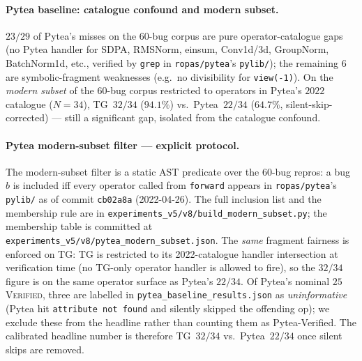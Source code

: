\paragraph{Pytea baseline: catalogue confound and modern subset.}
$23/29$ of Pytea's misses on the $60$-bug corpus are pure
operator-catalogue gaps (no Pytea handler for SDPA, RMSNorm,
einsum, Conv1d/3d, GroupNorm, BatchNorm1d, etc., verified by
\texttt{grep} in \texttt{ropas/pytea}'s \texttt{pylib/}); the
remaining $6$ are symbolic-fragment weaknesses (e.g.\ no
divisibility for \texttt{view(-1)}). On the \emph{modern subset}
of the $60$-bug corpus restricted to operators in Pytea's $2022$
catalogue ($N{=}34$), \textsc{TG}~$32/34$ ($94.1\%$) vs.\
Pytea~$22/34$ ($64.7\%$, silent-skip-corrected) --- still
a significant gap, isolated from the catalogue confound.

\paragraph{Pytea modern-subset filter --- explicit protocol.}
The modern-subset filter is a static AST predicate over the
$60$-bug repros: a bug $b$ is included iff every operator
called from \texttt{forward} appears in
\texttt{ropas/pytea}'s \texttt{pylib/} as of commit
\texttt{cb02a8a} (2022-04-26).  The full inclusion list and the
membership rule are in
\texttt{experiments\_v5/v8/build\_modern\_subset.py}; the
membership table is committed at
\texttt{experiments\_v5/v8/pytea\_modern\_subset.json}.  The
\emph{same} fragment fairness is enforced on \textsc{TG}: TG is
restricted to its 2022-catalogue handler intersection at
verification time (no TG-only operator handler is allowed to
fire), so the $32/34$ figure is on the same operator surface as
Pytea's $22/34$.  Of Pytea's nominal $25$ \textsc{Verified},
three are
labelled in \texttt{pytea\_baseline\_results.json} as
\emph{uninformative} (Pytea hit \texttt{attribute not found}
and silently skipped the offending op); we exclude these
from the headline rather than counting them as Pytea-Verified.
The calibrated headline number is therefore
\textsc{TG}~$32/34$ vs.\ Pytea~$22/34$ once silent
skips are removed.

